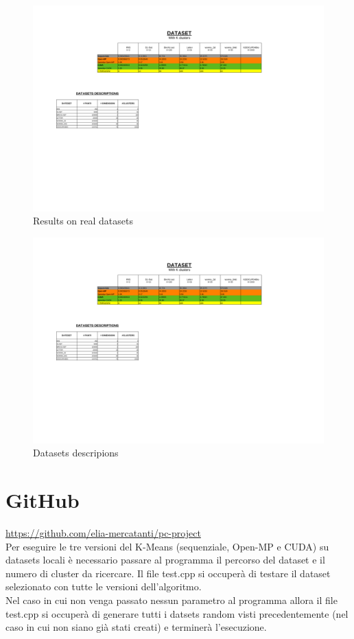 \documentclass[10pt,twocolumn,letterpaper]{article}
\begin{document}
\begin{figure}[h!]
	\centering
	\includegraphics[scale=0.9]{TableResults2.pdf}
	\caption{Results on real datasets}
	\label{fig:tablerealdatasets}
\end{figure}

\begin{figure}[h!]
	\centering
	\includegraphics[scale=0.7]{TableDatasetDescription.pdf}
	\caption{Datasets descripions}
	\label{fig:tabledescriptiondatasets}
\end{figure}




\section{GitHub}

\href{https://github.com/elia-mercatanti/pc-project}{https://github.com/elia-mercatanti/pc-project}\\
Per eseguire le tre versioni del K-Means (sequenziale, Open-MP e CUDA) su datasets locali è necessario passare al programma il percorso del dataset e il numero di cluster da ricercare. Il file test.cpp si occuperà di testare il dataset selezionato con tutte le versioni dell'algoritmo.\\
Nel caso in cui non venga passato nessun parametro al programma allora il file test.cpp si occuperà di generare tutti i datsets random visti precedentemente (nel caso in cui non siano già stati creati) e terminerà l'esecuzione.
\end{document}
